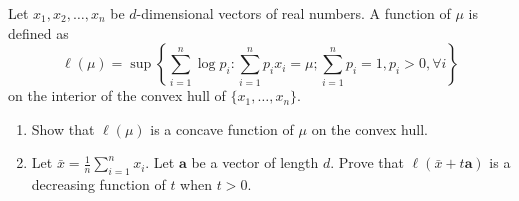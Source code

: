 \begin{exercise}\label{probability:2018:8}
Let $x_1, x_2, \dots, x_n$ be $d$-dimensional vectors of real numbers. A function of $\mu$ is defined as
\[
\ell(\mu) = \sup \left\{ \sum_{i=1}^n \log p_i : \sum_{i=1}^n p_i x_i = \mu ; \sum_{i=1}^n p_i = 1, p_i > 0, \forall i \right\}
\]
on the interior of the convex hull of $\{x_1, \dots, x_n\}$.
\begin{enumerate}
    \item[(a)] Show that $\ell(\mu)$ is a concave function of $\mu$ on the convex hull.
    \item[(b)] Let $\bar{x} = \frac{1}{n} \sum_{i=1}^n x_i$. Let $\mathbf{a}$ be a vector of length $d$. Prove that $\ell(\bar{x} + t\mathbf{a})$ is a decreasing function of $t$ when $t > 0$.
\end{enumerate}
\end{exercise}

